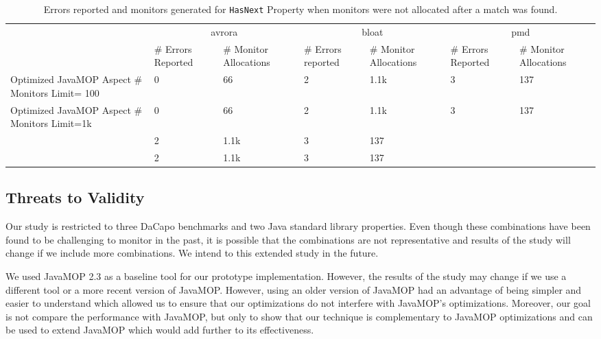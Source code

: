 \begin{table*}[ht]
\centering
\begin{tabular}{|p{3.7cm}|p{1.2cm}|p{1.5cm}|p{1.2cm}|p{1.5cm}|p{1.2cm}|p{1.5cm}|
}
\hline
\multirow{2}{*}{}               & \multicolumn{2}{c|}{avrora}             & 
\multicolumn{2}{c|}{bloat}            & \multicolumn{2}{c|}{pmd}              \\ 
\cline{2-7} 
                                       & \# Errors Reported  & \# Monitor 
Allocations & \# Errors reported & \# Monitor Allocations& \# Errors Reported & 
\# Monitor Allocations\\ \hline
Optimized JavaMOP Aspect \# Monitors Limit= 100            & 0             & 66  
          & 2           & 1.1k              & 3               & 137     \\ 
\hline
Optimized JavaMOP Aspect \# Monitors Limit=1k           & 0             & 66     
      & 2            & 1.1k              & 3               & 137       \\ \hline
     & 2            & 1.1k              & 3               &137       \\ \hline
    & 2            & 1.1k              & 3               & 137       \\ \hline
\end{tabular}
\caption{Errors reported and monitors generated for \texttt{HasNext} Property 
when monitors were not allocated after a match was found.}
\end{table*}
\label{table:errorreporting2}


\subsection{Threats to Validity}
\label{subsec:threats}

Our study is restricted to three DaCapo benchmarks and two Java standard library 
properties. Even though these combinations have been found to be challenging to 
monitor in the past, it is possible that the combinations are not representative 
and results of the study will change if we include more combinations. We intend 
to this extended study in the future.

We used JavaMOP 2.3 as a baseline tool for our prototype implementation. 
However, the results of the study may change if we use a different tool or a 
more recent version of JavaMOP. However, using an older version of JavaMOP had 
an advantage of being simpler and easier to understand which allowed us to 
ensure that our optimizations do not interfere with JavaMOP's optimizations. 
Moreover, our goal is not compare the performance with JavaMOP, but only to show 
that our technique is complementary to JavaMOP optimizations and can be used to 
extend JavaMOP which would add further to its effectiveness.

